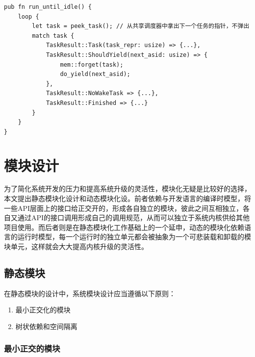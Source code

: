 \begin{lstlisting}[caption=用户执行器的设计]
pub fn run_until_idle() {
    loop {
        let task = peek_task(); // 从共享调度器中拿出下一个任务的指针，不弹出
        match task {
            TaskResult::Task(task_repr: usize) => {...},
            TaskResult::ShouldYield(next_asid: usize) => {
                mem::forget(task);
                do_yield(next_asid);
            },
            TaskResult::NoWakeTask => {...},
            TaskResult::Finished => {...}
        }
    }
}
\end{lstlisting}

\section{模块设计}

为了简化系统开发的压力和提高系统升级的灵活性，模块化无疑是比较好的选择，本文提出静态模块化设计和动态模块化设。前者依赖与开发语言的编译时模型，将一些API层面上的接口给正交开的，形成各自独立的模块，彼此之间互相独立，各自又通过API的接口调用形成自己的调用规范，从而可以独立于系统内核供给其他项目使用。而后者则是在静态模块化工作基础上的一个延申，动态的模块化依赖语言的运行时模型，每一个运行时的独立单元都会被抽象为一个可悲装载和卸载的模块单元，这样就会大大提高内核升级的灵活性。

\subsection{静态模块}

在静态模块的设计中，系统模块设计应当遵循以下原则：

\begin{enumerate}
    \item 最小正交化的模块
    \item 树状依赖和空间隔离
\end{enumerate}

\subsubsection{最小正交的模块}


